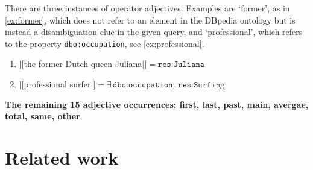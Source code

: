 \documentclass[11pt]{article}
\begin{document}
\vspace{-1.5em}
There are three instances of operator adjectives. Examples are `former', as in \ref{ex:former},
which does not refer to an element in the DBpedia ontology but is instead a disambiguation clue
in the given query, and `professional', which refers 
to the property \texttt{dbo:occupation}, see \ref{ex:professional}.
\begin{enumerate}
\item $|[$the former Dutch queen Juliana$|]=\texttt{res:Juliana}$ \label{ex:former}
\item %
    $|[$professional surfer$|]=\exists\,\texttt{dbo:occupation}\,.\,\texttt{res:Surfing}$ \label{ex:professional}
\end{enumerate}




\textbf{The remaining 15 adjective occurrences: first, last, past, main, avergae, total, same, other}

\section{Related work}
\end{document}
